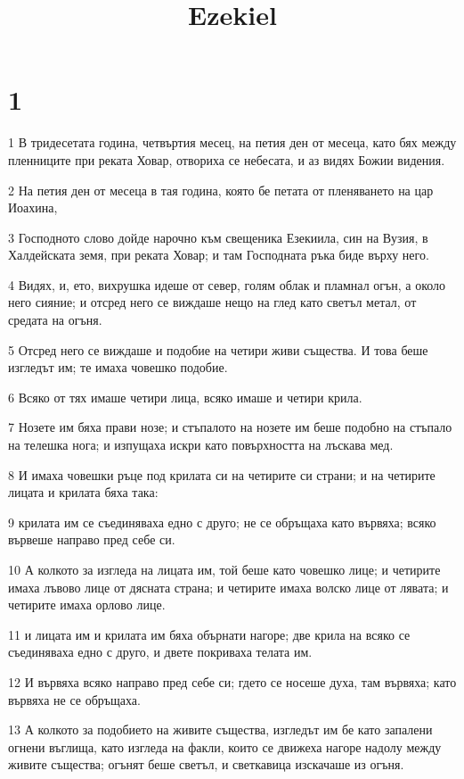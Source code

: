 

\title{Ezekiel}


\chapter{1}

\par 1 В тридесетата година, четвъртия месец, на петия ден от месеца, като бях между пленниците при реката Ховар, отвориха се небесата, и аз видях Божии видения.
\par 2 На петия ден от месеца в тая година, която бе петата от пленяването на цар Иоахина,
\par 3 Господното слово дойде нарочно към свещеника Езекиила, син на Вузия, в Халдейската земя, при реката Ховар; и там Господната ръка биде върху него.
\par 4 Видях, и, ето, вихрушка идеше от север, голям облак и пламнал огън, а около него сияние; и отсред него се виждаше нещо на глед като светъл метал, от средата на огъня.
\par 5 Отсред него се виждаше и подобие на четири живи същества. И това беше изгледът им; те имаха човешко подобие.
\par 6 Всяко от тях имаше четири лица, всяко имаше и четири крила.
\par 7 Нозете им бяха прави нозе; и стъпалото на нозете им беше подобно на стъпало на телешка нога; и изпущаха искри като повърхността на лъскава мед.
\par 8 И имаха човешки ръце под крилата си на четирите си страни; и на четирите лицата и крилата бяха така:
\par 9 крилата им се съединяваха едно с друго; не се обръщаха като вървяха; всяко вървеше направо пред себе си.
\par 10 А колкото за изгледа на лицата им, той беше като човешко лице; и четирите имаха лъвово лице от дясната страна; и четирите имаха волско лице от лявата; и четирите имаха орлово лице.
\par 11 и лицата им и крилата им бяха обърнати нагоре; две крила на всяко се съединяваха едно с друго, и двете покриваха телата им.
\par 12 И вървяха всяко направо пред себе си; гдето се носеше духа, там вървяха; като вървяха не се обръщаха.
\par 13 А колкото за подобието на живите същества, изгледът им бе като запалени огнени въглища, като изгледа на факли, които се движеха нагоре надолу между живите същества; огънят беше светъл, и светкавица изскачаше из огъня.
